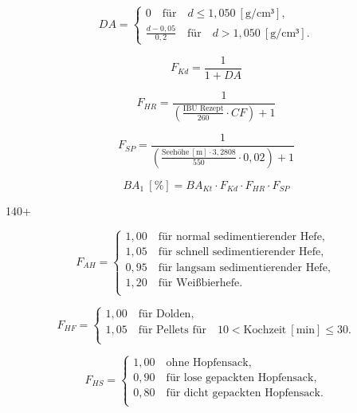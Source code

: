 \documentclass[a4paper,parskip=half]{scrartcl}
\newcommand{\BA}{\mathit{BA}}
\newcommand{\BAKt}{{\mathit{BA}}_{\mathit{Kt}}}
\newcommand{\umin}{\:[\textrm{min}]}
\newcommand{\uden}{\:[\textrm{g/cm³}]}
\newcommand{\uper}{\:[\textrm{\%}]}
\newcommand{\ume}{\:[\textrm{m}]}
\newcommand{\FKd}{F_{\mathit{Kd}}}
\newcommand{\FHR}{F_{\mathit{HR}}}
\newcommand{\FSP}{F_{\mathit{SP}}}
\newcommand{\FAH}{F_{\mathit{AH}}}
\newcommand{\FHF}{F_{\mathit{HF}}}
\newcommand{\FHS}{F_{\mathit{HS}}}
\begin{document}
\begin{equation}
\mathit{DA} = \begin{cases}
0 \quad \textrm{für} \quad d \le 1,050 \uden, \\
\frac{d - 0,05}{0,2} \quad \textrm{für} \quad d > 1,050 \uden.
\end{cases}
\label{eq:garetzga}
\end{equation}

\begin{equation}
\FKd = \frac{1}{1 + DA}
\label{eq:garetzkd}
\end{equation}

\begin{equation}
\FHR = \frac{1}{\left( \frac{\textrm{IBU Rezept}}{260} \cdot \mathit{CF} \right) + 1}
\label{eq:garetzhr}
\end{equation}

\begin{equation}
\FSP = \frac{1}{\left(\frac{\textrm{Seehöhe} \ume \cdot 3,2808}{550} \cdot 0,02 \right) + 1}
\label{eq:garetzsp}
\end{equation}

\begin{equation}
\BA_1 \uper = \BAKt \cdot \FKd \cdot \FHR \cdot \FSP
\label{eq:garetzba1}
\end{equation}

140+

\begin{equation}
\FAH = \begin{cases}
1,00 \quad \textrm{für normal sedimentierender Hefe}, \\
1,05 \quad \textrm{für schnell sedimentierender Hefe}, \\
0,95 \quad \textrm{für langsam sedimentierender Hefe}, \\
1,20 \quad \textrm{für Weißbierhefe}. \\
\end{cases}
\label{eq:garetzbah}
\end{equation}


\begin{equation}
\FHF = \begin{cases}
1,00 \quad \textrm{für Dolden}, \\
1,05 \quad \textrm{für Pellets für} \quad 10 < \textrm{Kochzeit} \umin \le 30. \\
\end{cases}
\label{eq:garetzhf}
\end{equation}

\begin{equation}
\FHS = \begin{cases}
1,00 \quad \textrm{ohne Hopfensack}, \\
0,90 \quad \textrm{für lose gepackten Hopfensack}, \\
0,80 \quad \textrm{für dicht gepackten Hopfensack}. \\
\end{cases}
\label{eq:garetzhs}
\end{equation}
\end{document}
